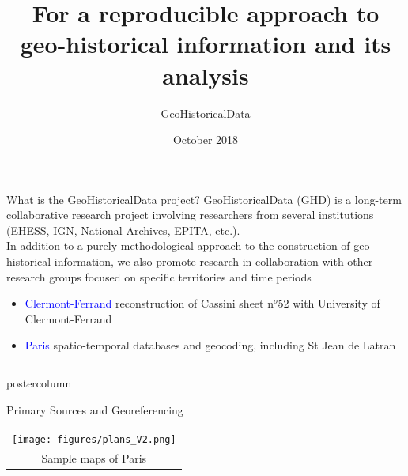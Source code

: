 \documentclass[final,hyperref={pdfpagelabels=false}]{beamer}
\title{For a reproducible approach to geo-historical information and its analysis}
\author{GeoHistoricalData}
\institute{GeoHistoricalData Research Group}
\date{October 2018}
\let\oldcite=\cite
\renewcommand{\cite}[1]{\textcolor{ta3chameleon}{\oldcite{#1}}}
\begin{document}
\begin{frame}
  \begin{block}{What is the GeoHistoricalData project?}
    \textcolor{ta3orange}{GeoHistoricalData} (GHD) is a long-term collaborative research project involving researchers from several institutions (EHESS, IGN, National Archives, EPITA, etc.).\\
    In addition to a purely methodological approach to the construction of geo-historical information, we also promote research in collaboration with other research groups focused on specific territories and time periods
    \begin{itemize}
    \item \textcolor{blue}{Clermont-Ferrand} \textcolor{ta3orange}{reconstruction of Cassini sheet n$^{o}$52} with University of Clermont-Ferrand
    \item \textcolor{blue}{Paris} spatio-temporal databases and geocoding, including \textcolor{ta3orange}{St Jean de Latran}~\cite{Rebolledo-Dhuin2014}
    \end{itemize}
  \end{block}
  \begin{columns}
    \begin{column}{0.5\textwidth}
    \begin{beamercolorbox}[center,wd=\textwidth]{postercolumn}
    \begin{minipage}[t]{.98\textwidth}
    \renewcommand{\footnoterule}{}
      \begin{block}{Primary Sources and Georeferencing}
        \begin{tabular}{p{}p{}}
          \multicolumn{2}{c}{\texttt{[image: figures/plans\_V2.png]}}\\
	  \multicolumn{2}{c}{Sample maps of Paris}\\%

\end{tabular}
\end{block}
\end{minipage}
\end{beamercolorbox}
\end{column}
\end{columns}
\end{frame}
\end{document}
